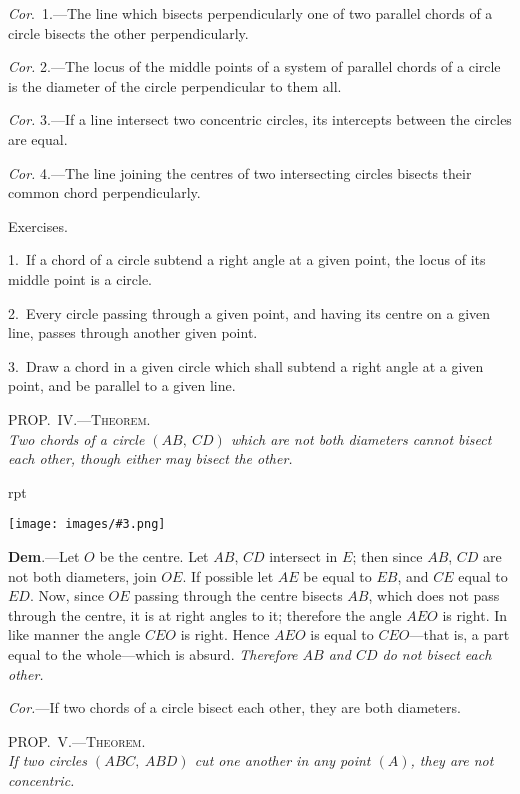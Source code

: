 \documentclass[oneside]{book}
\newcounter{wrapwidth}
\newcommand\myprop[2]{
\bigskip\Needspace*{4\baselineskip}\begin{center}\textsc{#1}\\\medskip\emph{#2}\par\end{center}
}
\newcommand\exhead[1]{
\Needspace*{5\baselineskip}\begin{center}
\textsf{#1}
\end{center}
}
\newcommand\imgflow[3]{
\setcounter{wrapwidth}{#1}
\begin{wrapfigure}[#2]{r}{\value{wrapwidth}pt}
\begin{center}
\vspace{-0.3in}
\texttt{[image: images/\#3.png]}
\end{center}
\end{wrapfigure}
}
\begin{document}
\emph{Cor}.\ 1.---The line which bisects perpendicularly one
of two parallel chords of a circle bisects the other perpendicularly.


\textit{Cor.} 2.---The locus of the middle points of a system
of parallel chords of a circle is the diameter of the
circle perpendicular to them all.

\textit{Cor.} 3.---If a line intersect two concentric circles,
its intercepts between the circles are equal.

\textit{Cor.} 4.---The line joining the centres of two intersecting
circles bisects their common chord perpendicularly.


\exhead{Exercises.}

\begin{footnotesize}
1.~If a chord of a circle subtend a right angle at a given
point, the locus of its middle point is a circle.

2.~Every circle passing through a given point, and having its
centre on a given line, passes through another given point.

3.~Draw a chord in a given circle which shall subtend a right
angle at a given point, and be parallel to a given line.
\par\end{footnotesize}


\myprop{PROP\@.~IV\@.---Theorem.}{Two chords of a circle $(AB,\ CD)$ which are not both
diameters cannot bisect each other, though either may
bisect the other.}

\imgflow{115}{9}{f107}

\textbf{Dem}.---Let $O$ be the centre. Let $AB$, $CD$ intersect
in $E$; then since $AB$, $CD$ are not
both diameters, join $OE$. If possible
let $AE$ be equal to $EB$, and
$CE$ equal to $ED$. Now, since $OE$
passing through the centre bisects
$AB$, which does not pass through
the centre, it is at right angles to
it; therefore the angle $AEO$ is
right. In like manner the angle
$CEO$ is right. Hence $AEO$ is equal to $CEO$---that is,
a part equal to the whole---which is absurd. \textit{Therefore
$AB$ and $CD$ do not bisect each other.}

\textit{Cor.}---If two chords of a circle bisect each other,
they are both diameters.


\myprop{PROP\@.~V.---Theorem.}{If two circles $(ABC,\ ABD)$ cut one another in any point
$(A)$, they are not concentric.}
\end{document}
